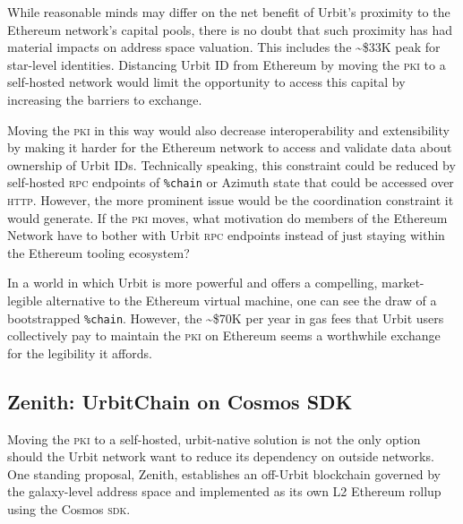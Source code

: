 \documentclass[twoside]{article}
\begin{document}
While reasonable minds may differ on the net benefit of Urbit's proximity to the Ethereum network's capital pools, there is no doubt that such proximity has had material impacts on address space valuation. This includes the \textasciitilde\$33K peak for star-level identities. Distancing Urbit ID from Ethereum by moving the \textsc{pki} to a self-hosted network would limit the opportunity to access this capital by increasing the barriers to exchange.

Moving the \textsc{pki} in this way would also decrease interoperability and extensibility by making it harder for the Ethereum network to access and validate data about ownership of Urbit IDs. Technically speaking, this constraint could be reduced by self-hosted \textsc{rpc} endpoints of \lstinline[style=inlinecode]{%chain} or Azimuth state that could be accessed over \textsc{http}. However, the more prominent issue would be the coordination constraint it would generate. If the \textsc{pki} moves, what motivation do members of the Ethereum Network have to bother with Urbit \textsc{rpc} endpoints instead of just staying within the Ethereum tooling ecosystem?

In a world in which Urbit is more powerful and offers a compelling, market-legible alternative to the Ethereum virtual machine, one can see the draw of a bootstrapped \lstinline[style=inlinecode]{%chain}. However, the \textasciitilde\$70K per year in gas fees that Urbit users collectively pay to maintain the \textsc{pki} on Ethereum seems a worthwhile exchange for the legibility it affords.

\subsection[Zenith:  UrbitChain on Cosmos \textsc{sdk}]{Zenith:  UrbitChain on Cosmos SDK}

Moving the \textsc{pki} to a self-hosted, urbit-native solution is not the only option should the Urbit network want to reduce its dependency on outside networks. One standing proposal, Zenith, establishes an off-Urbit blockchain governed by the galaxy-level address space and implemented as its own L2 Ethereum rollup using the Cosmos \textsc{sdk}.
\end{document}
